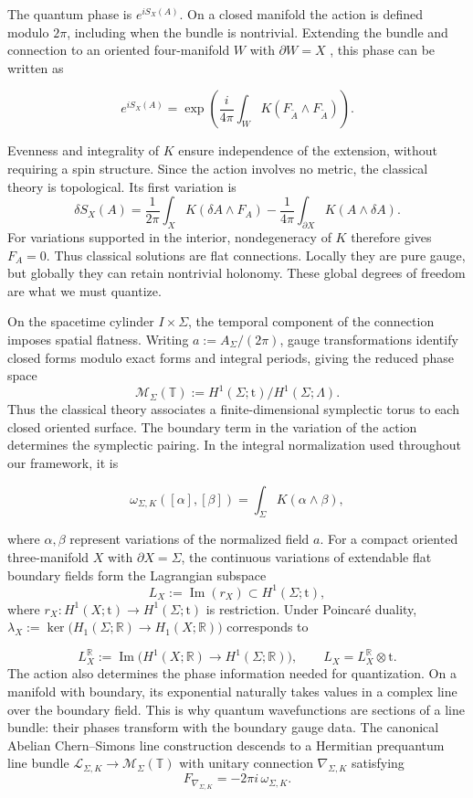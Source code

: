 \documentclass[12pt]{amsart}
\numberwithin{equation}{section}
\theoremstyle{definition}
\begin{document}
The quantum phase is $e^{iS_X(A)}$. On a closed manifold the action is defined modulo $2\pi$, including when the bundle is nontrivial. Extending the bundle and connection to an oriented four-manifold $W$ with $\partial W=X$ \cite{FreedCS2}, this phase can be written as

$$
e^{iS_X(A)}
=
\exp\!\left(
\frac{i}{4\pi}\int_W
K(F_{\widetilde A}\wedge F_{\widetilde A})
\right).
$$

Evenness and integrality of $K$ ensure independence of the extension, without requiring a spin structure. Since the action involves no metric, the classical theory is topological. Its first variation is
$$
\delta S_X(A)
=
\frac{1}{2\pi}\int_X K(\delta A\wedge F_A)
-\frac{1}{4\pi}\int_{\partial X}K(A\wedge\delta A).
$$
For variations supported in the interior, nondegeneracy of $K$ therefore gives $F_A=0.$ Thus classical solutions are flat connections. Locally they are pure gauge, but globally they can retain nontrivial holonomy. These global degrees of freedom are what we must quantize.

On the spacetime cylinder $I\times\Sigma$, the temporal component of the connection imposes spatial flatness. Writing $a:=A_\Sigma/(2\pi)$, gauge transformations identify closed forms modulo exact forms and integral periods, giving the reduced phase space
$$
\mathcal M_\Sigma(\mathbb T)
:=
H^1(\Sigma;\mathrm t)/H^1(\Sigma;\Lambda).
$$
 Thus the classical theory associates a finite-dimensional symplectic torus to each closed oriented surface. The boundary term in the variation of the action determines the symplectic pairing. In the integral normalization used throughout our framework, it is

$$
\omega_{\Sigma,K}([\alpha],[\beta])
=
\int_\Sigma K(\alpha\wedge\beta),
$$

where $\alpha,\beta$ represent variations of the normalized field $a$.  For a compact oriented three-manifold $X$ with $\partial X=\Sigma$, the continuous variations of extendable flat boundary fields form the Lagrangian subspace
$$
L_X:=\operatorname{Im}(r_X)\subset H^1(\Sigma;\mathrm t),
$$
where $r_X:H^1(X;\mathrm t)\to H^1(\Sigma;\mathrm t)$ is restriction. Under Poincar\'e duality, $\lambda_X:=\ker\!\bigl(H_1(\Sigma;\mathbb R)\to H_1(X;\mathbb R)\bigr)$ corresponds to

$$
L_X^{\mathbb R}
:=
\operatorname{Im}\!\bigl(
H^1(X;\mathbb R)\to H^1(\Sigma;\mathbb R)
\bigr),
\qquad
L_X=L_X^{\mathbb R}\otimes\mathrm t.
$$
The action also determines the phase information needed for quantization. On a manifold with boundary, its exponential naturally takes values in a complex line over the boundary field. This is why quantum wavefunctions are sections of a line bundle: their phases transform with the boundary gauge data. The canonical Abelian Chern--Simons line construction descends to a Hermitian prequantum line bundle $\mathcal L_{\Sigma,K}\rightarrow  \mathcal M_\Sigma(\mathbb T)$ with unitary connection $\nabla_{\Sigma,K}$ satisfying
$$
F_{\nabla_{\Sigma,K}}=-2\pi i\,\omega_{\Sigma,K}.
$$
\end{document}
